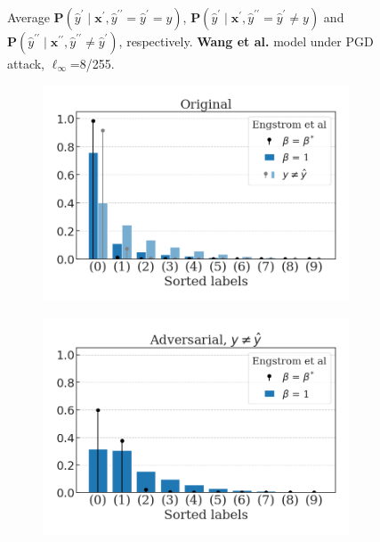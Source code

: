 \begin{figure}[H]
    \caption{Average $\mathbf{P}(\hat{y}^\prime \mid \mathbf{x}^\prime, \hat{y}^{\prime \prime} = \hat{y}^\prime = y)$,
    $\mathbf{P}(\hat{y}^\prime \mid \mathbf{x}^\prime, \hat{y}^{\prime \prime} = \hat{y}^\prime \neq y)$ and
    $\mathbf{P}(\hat{y}^{\prime \prime} \mid \mathbf{x}^{\prime \prime}, \hat{y}^{\prime \prime} \neq \hat{y}^\prime)$,
    respectively. {\color{tab:brown} \textbf{Wang et al.}} model under PGD attack, $\ell_\infty$=8/255.}
    \label{fig:pgd_distributions_wang2023}
\end{figure}
\begin{figure}[H]
    \centering
    \begin{subfigure}[b]{0.45\textwidth}
        \centering
        \includegraphics[width=\textwidth]{img/results_discussion/adversarial/Engstrom2019Robustness_orig_PGD_0.0314.png}
    \end{subfigure}
    \hfill
    \begin{subfigure}[b]{0.45\textwidth}
        \centering
        \includegraphics[width=\textwidth]{img/results_discussion/adversarial/Engstrom2019Robustness_adv_PGD_0.0314.png}
    \end{subfigure}


\end{figure}
